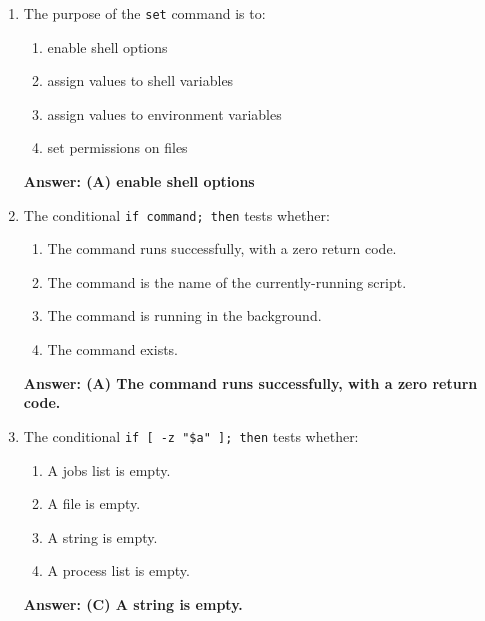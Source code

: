 \documentclass{article}
\begin{document}
\begin{enumerate}
  \item The purpose of the \texttt{set} command is to:
  \begin{enumerate}[label=(\Alph*)]
    \item enable shell options
    \item assign values to shell variables
    \item assign values to environment variables
    \item set permissions on files
  \end{enumerate}
  \textbf{Answer: (A) enable shell options}

  \item The conditional \texttt{if command; then} tests whether:
  \begin{enumerate}[label=(\Alph*)]
    \item The command runs successfully, with a zero return code.
    \item The command is the name of the currently-running script.
    \item The command is running in the background.
    \item The command exists.
  \end{enumerate}
  \textbf{Answer: (A) The command runs successfully, with a zero return code.}

  \item The conditional \texttt{if [ -z "\$a" ]; then} tests whether:
  \begin{enumerate}[label=(\Alph*)]
    \item A jobs list is empty.
    \item A file is empty.
    \item A string is empty.
    \item A process list is empty.
  \end{enumerate}
  \textbf{Answer: (C) A string is empty.}
\end{enumerate}
\end{document}
